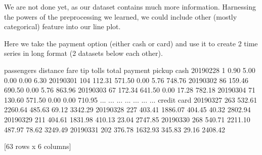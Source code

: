\documentclass[letterpaper,10pt,english]{jupyterBook}
\begin{document}
\sphinxAtStartPar
We are not done yet, as our dataset contains much more information.
Harnessing the powers of the preprocessing we learned, we could include other (mostly categorical) feature into our line plot.

\sphinxAtStartPar
Here we take the payment option (either cash or card) and use it to create 2 time series in long format (2 datasets below each other).

\begin{sphinxVerbatim}[commandchars=\\\{\}]
  
      
\end{sphinxVerbatim}

\begin{sphinxVerbatim}[commandchars=\\\{\}]
                        passengers  distance     fare     tip  tolls    total
payment     pickup                                                           
cash        2019\PYGZhy{}02\PYGZhy{}28           1      0.90     5.00    0.00   0.00     6.30
            2019\PYGZhy{}03\PYGZhy{}01         104    112.31   571.50    0.00   5.76   748.76
            2019\PYGZhy{}03\PYGZhy{}02          86    159.46   690.50    0.00   5.76   863.96
            2019\PYGZhy{}03\PYGZhy{}03          67    172.34   641.50    0.00  17.28   782.18
            2019\PYGZhy{}03\PYGZhy{}04          71    130.60   571.50    0.00   0.00   710.95
...                            ...       ...      ...     ...    ...      ...
credit card 2019\PYGZhy{}03\PYGZhy{}27         263    532.61  2260.64  485.63  69.12  3342.29
            2019\PYGZhy{}03\PYGZhy{}28         227    403.41  1886.07  404.45  40.32  2802.94
            2019\PYGZhy{}03\PYGZhy{}29         211    404.61  1831.98  410.13  23.04  2747.85
            2019\PYGZhy{}03\PYGZhy{}30         268    540.71  2211.10  487.97  78.62  3249.49
            2019\PYGZhy{}03\PYGZhy{}31         202    376.78  1632.93  345.83  29.16  2408.42

[63 rows x 6 columns]
\end{sphinxVerbatim}
\end{document}
